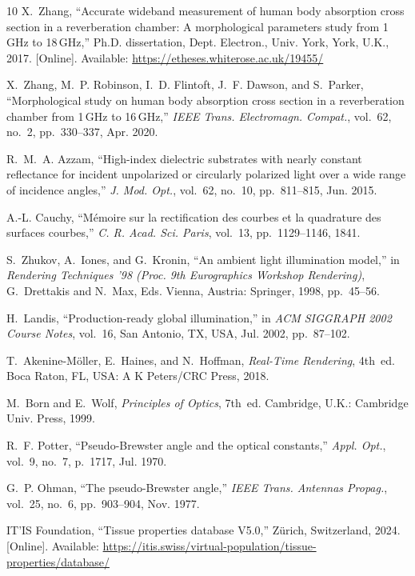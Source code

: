\documentclass[journal,twocolumn,10pt]{IEEEtran}
\begin{document}
\begin{thebibliography}{10}
X.~Zhang, ``Accurate wideband measurement of human body absorption cross
  section in a reverberation chamber: A morphological parameters study
  from 1\,GHz to 18\,GHz,'' Ph.D. dissertation, Dept. Electron., Univ.
  York, York, U.K., 2017. [Online]. Available:
  \url{https://etheses.whiterose.ac.uk/19455/}

X.~Zhang, M.~P. Robinson, I.~D. Flintoft, J.~F. Dawson, and S.~Parker,
  ``Morphological study on human body absorption cross section in a
  reverberation chamber from 1\,GHz to 16\,GHz,'' \emph{IEEE Trans.
  Electromagn. Compat.}, vol.~62, no.~2, pp.~330--337, Apr. 2020.

R.~M.~A. Azzam, ``High-index dielectric substrates with nearly constant
  reflectance for incident unpolarized or circularly polarized light over
  a wide range of incidence angles,'' \emph{J. Mod. Opt.}, vol.~62,
  no.~10, pp.~811--815, Jun. 2015.

A.-L. Cauchy, ``M\'emoire sur la rectification des courbes et la
  quadrature des surfaces courbes,'' \emph{C. R. Acad. Sci. Paris},
  vol.~13, pp.~1129--1146, 1841.

S.~Zhukov, A.~Iones, and G.~Kronin, ``An ambient light illumination
  model,'' in \emph{Rendering Techniques '98 (Proc. 9th Eurographics
  Workshop Rendering)}, G.~Drettakis and N.~Max, Eds.
  Vienna, Austria: Springer, 1998, pp.~45--56.

H.~Landis, ``Production-ready global illumination,'' in \emph{ACM
  SIGGRAPH 2002 Course Notes}, vol.~16, San Antonio, TX, USA, Jul. 2002,
  pp.~87--102.

T.~Akenine-M{\"o}ller, E.~Haines, and N.~Hoffman, \emph{Real-Time
  Rendering}, 4th~ed. Boca Raton, FL, USA: A K Peters/CRC Press,
  2018.

M.~Born and E.~Wolf, \emph{Principles of Optics}, 7th~ed.
  Cambridge, U.K.: Cambridge Univ. Press, 1999.

R.~F. Potter, ``Pseudo-Brewster angle and the optical constants,''
  \emph{Appl. Opt.}, vol.~9, no.~7, p.~1717, Jul. 1970.

G.~P. Ohman, ``The pseudo-Brewster angle,'' \emph{IEEE Trans. Antennas
  Propag.}, vol.~25, no.~6, pp.~903--904, Nov. 1977.

IT'IS Foundation, ``Tissue properties database V5.0,'' Z\"urich,
  Switzerland, 2024. [Online]. Available:
  \url{https://itis.swiss/virtual-population/tissue-properties/database/}


\end{thebibliography}
\end{document}
